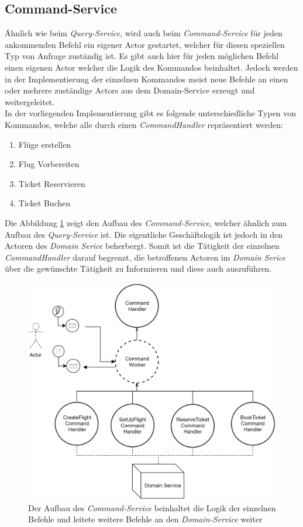 \subsection{Command-Service}
\label{subsec:implementation:commandService}
 Ähnlich wie beim \textit{Query-Service}, wird auch beim \textit{Command-Service} für jeden ankommenden Befehl ein eigener Actor gestartet, welcher für diesen speziellen Typ von Anfrage zuständig ist. Es gibt auch hier für jeden möglichen Befehl einen eigenen Actor welcher die Logik des Kommandos beinhaltet. Jedoch werden in der Implementierung der einzelnen Kommandos meist neue Befehle an einen oder mehrere zuständige Actors aus dem Domain-Service erzeugt und weitergeleitet. \\
 In der vorliegenden Implementierung gibt es folgende unterschiedliche Typen von Kommandos, welche alle durch einen \textit{CommandHandler} repräsentiert werden:
 \begin{enumerate}
     \item Flüge erstellen
     \item Flug Vorbereiten
     \item Ticket Reservieren
     \item Ticket Buchen
 \end{enumerate}
Die Abbildung \ref{fig:implementation:commandActorModel} zeigt den Aufbau des \textit{Command-Service}, welcher ähnlich zum Aufbau des \textit{Query-Service} ist. Die eigentliche Geschäftslogik ist jedoch in den Actoren des \textit{Domain Serice} beherbergt. Somit ist die Tätigkeit der einzelnen \textit{CommandHandler} darauf begrenzt, die betroffenen Actoren im \textit{Domain Serice} über die gewünschte Tätigkeit zu Informieren und diese auch auszuführen. 
 \begin{figure}
    \centering
    \includegraphics[width=0.8\linewidth]{gfx/implementation/CommandServiceActorModel}
    \caption{Der Aufbau des \textit{Command-Service} beinhaltet die Logik der einzelnen Befehle und leitete weitere Befehle an den \textit{Domain-Service} weiter }
    \label{fig:implementation:commandActorModel}
\end{figure} 

